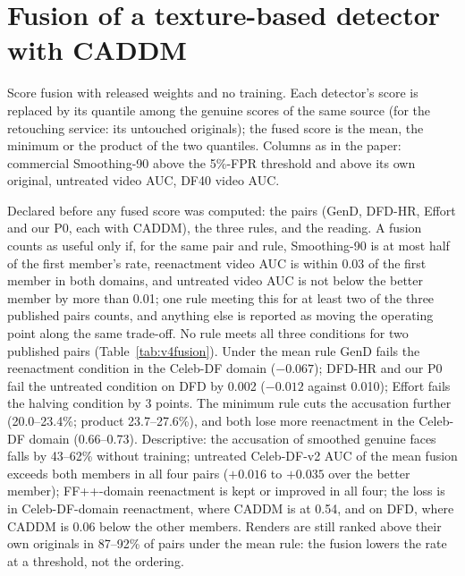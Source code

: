\documentclass[10pt]{article}
\begin{document}
\section{Fusion of a texture-based detector with CADDM}
\begin{table}[H]
\centering
\caption{Score fusion with released weights and no training. Each detector's score is replaced by its quantile among
the genuine scores of the same source (for the retouching service: its untouched originals); the fused score is the
mean, the minimum or the product of the two quantiles. Columns as in the paper: commercial Smoothing-90 above the
5\%-FPR threshold and above its own original, untreated video AUC, DF40 video AUC.}
\label{tab:v4fusion}
\scriptsize
\begin{adjustbox}{max width=\linewidth}\end{adjustbox}
\end{table}
Declared before any fused score was computed: the pairs (GenD, DFD-HR, Effort and our P0, each with CADDM), the three
rules, and the reading. A fusion counts as useful only if, for the same pair and rule, Smoothing-90 is at most half of
the first member's rate, reenactment video AUC is within 0.03 of the first member in both domains, and untreated video
AUC is not below the better member by more than 0.01; one rule meeting this for at least two of the three published
pairs counts, and anything else is reported as moving the operating point along the same trade-off. No rule meets all
three conditions for two published pairs (Table~\ref{tab:v4fusion}). Under the mean rule GenD fails the reenactment
condition in the Celeb-DF domain ($-0.067$); DFD-HR and our P0 fail the untreated condition on DFD by 0.002 ($-0.012$
against 0.010); Effort fails the halving condition by 3 points. The minimum rule cuts the accusation further
(20.0--23.4\%; product 23.7--27.6\%), and both lose more reenactment in the Celeb-DF domain (0.66--0.73). Descriptive: the accusation of smoothed
genuine faces falls by 43--62\% without training; untreated Celeb-DF-v2 AUC of the mean fusion exceeds both members in
all four pairs ($+0.016$ to $+0.035$ over the better member); FF++-domain reenactment is kept or improved in all four;
the loss is in Celeb-DF-domain reenactment, where CADDM is at 0.54, and on DFD, where CADDM is 0.06 below the other
members. Renders are still ranked above their own originals in 87--92\% of pairs under the mean rule: the fusion lowers
the rate at a threshold, not the ordering.
\end{document}
